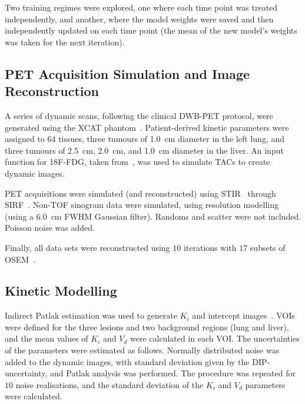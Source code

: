             Two training regimes were explored, one where each time point was treated independently, and another, where the model weights were saved and then independently updated on each time point (the mean of the new model's weights was taken for the next iteration).
        
        \subsection{PET Acquisition Simulation and Image Reconstruction} \label{sec:pseudo_bayesian_dip_denoising_as_a_preprocessing_step_for_kinetic_modelling_in_dynamic_pet_appendix_methods_pet_acquisition_simulation_and_image_reconstruction}
            A series of dynamic scans, following the clinical \gls{DWB}-\gls{PET} protocol, were generated using the \gls{XCAT} phantom~\parencite{Segars2010}. Patient-derived kinetic parameters were assigned to $64$ tissues, three tumours of \SI{1.0}{\centi\meter} diameter in the left lung, and three tumours of \SI{2.5}{\centi\meter}, \SI{2.0}{\centi\meter}, and \SI{1.0}{\centi\meter} diameter in the liver. An input function for \gls{18F-FDG}, taken from~\parencite{Langsjo2004EffectsHumans}, was used to simulate \glspl{TAC} to create dynamic images.
    
            \gls{PET} acquisitions were simulated (and reconstructed) using \gls{STIR}~\parencite{Thielemans2012} through \gls{SIRF}~\parencite{Ovtchinnikov2017}. \gls{Non-TOF} sinogram data were simulated, using resolution modelling (using a \SI{6.0}{\centi\meter} \gls{FWHM} Gaussian filter). Randoms and scatter were not included. Poisson noise was added.%
    
            Finally, all data sets were reconstructed using $10$ iterations with $17$ subsets of \gls{OSEM}~\parencite{Hudson1994}.
        
        \subsection{Kinetic Modelling} \label{sec:pseudo_bayesian_dip_denoising_as_a_preprocessing_step_for_kinetic_modelling_in_dynamic_pet_appendix_methods_kinetic_modelling}
            Indirect Patlak estimation was used to generate $K_i$ and intercept images~\parencite{Patlak1983GraphicalData}. \glspl{VOI} were defined for the three lesions and two background regions (lung and liver), and the mean values of $K_i$ and $V_d$ were calculated in each \gls{VOI}. The uncertainties of the parameters were estimated as follows. Normally distributed noise was added to the dynamic images, with standard deviation given by the \gls{DIP}-uncertainty, and Patlak analysis was performed. The procedure was repeated for $10$ noise realisations, and the standard deviation of the $K_i$ and $V_d$ parameters were calculated.
        
